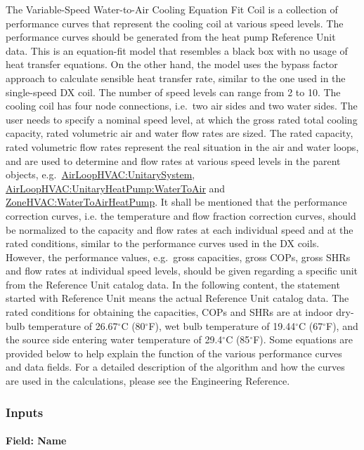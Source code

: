 The Variable-Speed Water-to-Air Cooling Equation Fit Coil is a collection of performance curves that represent the cooling coil at various speed levels. The performance curves should be generated from the heat pump Reference Unit data. This is an equation-fit model that resembles a black box with no usage of heat transfer equations. On the other hand, the model uses the bypass factor approach to calculate sensible heat transfer rate, similar to the one used in the single-speed DX coil. The number of speed levels can range from 2 to 10. The cooling coil has four node connections, i.e.~two air sides and two water sides. The user needs to specify a nominal speed level, at which the gross rated total cooling capacity, rated volumetric air and water flow rates are sized. The rated capacity, rated volumetric flow rates represent the real situation in the air and water loops, and are used to determine and flow rates at various speed levels in the parent objects, e.g.~\hyperref[airloophvacunitarysystem]{AirLoopHVAC:UnitarySystem}, \hyperref[airloophvacunitaryheatpumpwatertoair]{AirLoopHVAC:UnitaryHeatPump:WaterToAir} and \hyperref[zonehvacwatertoairheatpump]{ZoneHVAC:WaterToAirHeatPump}. It shall be mentioned that the performance correction curves, i.e. the temperature and flow fraction correction curves, should be normalized to the capacity and flow rates at each individual speed and at the rated conditions, similar to the performance curves used in the DX coils. However, the performance values, e.g.~gross capacities, gross COPs, gross SHRs and flow rates at individual speed levels, should be given regarding a specific unit from the Reference Unit catalog data. In the following content, the statement started with Reference Unit means the actual Reference Unit catalog data. The rated conditions for obtaining the capacities, COPs and SHRs are at indoor dry-bulb temperature of 26.67$^\circ$C (80$^\circ$F), wet bulb temperature of 19.44$^\circ$C (67$^\circ$F), and the source side entering water temperature of 29.4$^\circ$C (85$^\circ$F). Some equations are provided below to help explain the function of the various performance curves and data fields. For a detailed description of the algorithm and how the curves are used in the calculations, please see the Engineering Reference.

\subsubsection{Inputs}\label{inputs-31}

\paragraph{Field: Name}\label{field-name-30}

